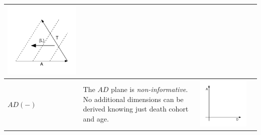 \documentclass[
  12pt
]{scrartcl}
\begin{document}
\begin{center}
\begin{longtable}{m{}m{}m{}m{}}
  \includegraphics[width = \linewidth]{../fig/TAl_iso.pdf}  \\
  \midrule
  $AD(-)$ &
  The $AD$ plane is \emph{non-informative}. No additional dimensions can be derived knowing just death cohort and age. &
  \includegraphics[width = \linewidth]{../fig/AD.pdf} &

\end{longtable}
\end{center}
\end{document}
